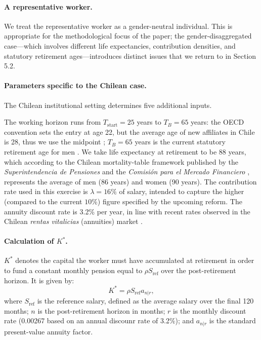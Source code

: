 \documentclass[11pt]{article}
\newcommand{\Kstar}{K^{*}}
\newcommand{\Tstart}{T_{\mathrm{start}}}
\newcommand{\TB}{T_{B}}
\begin{document}
\paragraph{A representative worker.}
We treat the representative worker as a gender-neutral individual. 
This is appropriate for the methodological focus of the paper; the 
gender-disaggregated case---which involves different life 
expectancies, contribution densities, and statutory retirement 
ages---introduces distinct issues that we return to in 
Section  5.2.



\paragraph{Parameters specific to the Chilean case.}
The Chilean institutional setting determines five additional inputs.


The working horizon runs from $\Tstart=25$ years to $\TB=65$ years: the OECD convention sets the entry at age 22, but the average age of new affiliates in Chile is 28, thus we use the midpoint \cite{oecd2025,sp2024ficha}; $\TB=65$ years is the current statutory retirement age for men \cite{dl3500}. 
We take life expectancy at retirement to be  88 years, which according to 
the Chilean mortality-table framework published by the 
\textit{Superintendencia de Pensiones} and the \textit{Comisi\'{o}n 
para el Mercado Financiero} \cite{sp2023mortality}, represents 
the average of men (86 years) and women (90 years).
The contribution rate used in this exercise is $\lambda=16\%$ of salary, intended to capture the higher (compared to the current $10\%$) figure specified by the upcoming reform. The annuity discount rate is  3.2\% per year, in line with recent rates observed in the Chilean \emph{rentas vitalicias} (annuities) market  \cite{spRentasVitalicias}.



\paragraph{Calculation of $\Kstar$.}
$K^*$ denotes the capital the worker must have accumulated 
at retirement in order to fund a constant monthly pension 
equal to $\rho S_{\mathrm{ref}}$ over the post-retirement horizon.
It is given by:
\begin{equation}
\Kstar = \rho S_{\mathrm{ref}}a_{n|r},
\end{equation}
where $S_{\mathrm{ref}}$ is the reference salary, defined as the average  salary over the final 120 months; $n$ is the post-retirement horizon in months; $r$ is the monthly discount rate (0.00267 based on an annual discounr rate of 3.2\%); and $a_{n|r}$ is the standard present-value annuity factor.
\end{document}
